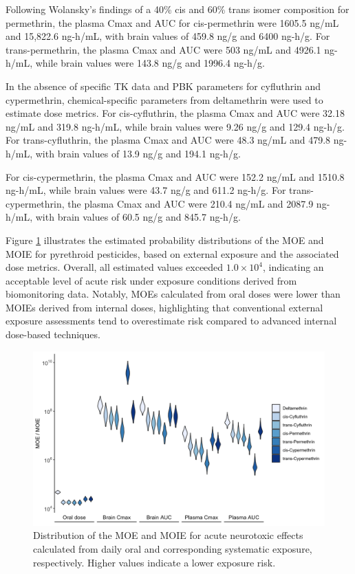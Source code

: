 \documentclass[toxics,article,submit,pdftex,moreauthors]{Definitions/mdpi}
\begin{document}
Following Wolansky's findings of a 40\% cis and 60\% trans isomer
composition for permethrin, the plasma Cmax and AUC for cis-permethrin
were 1605.5 ng/mL and 15,822.6 ng-h/mL, with brain values of 459.8 ng/g
and 6400 ng-h/g. For trans-permethrin, the plasma Cmax and AUC were 503
ng/mL and 4926.1 ng-h/mL, while brain values were 143.8 ng/g and 1996.4
ng-h/g.

In the absence of specific TK data and PBK parameters
for cyfluthrin and cypermethrin, chemical-specific parameters from
deltamethrin were used to estimate dose metrics. For cis-cyfluthrin, the
plasma Cmax and AUC were 32.18 ng/mL and 319.8 ng-h/mL, while brain
values were 9.26 ng/g and 129.4 ng-h/g. For trans-cyfluthrin, the plasma
Cmax and AUC were 48.3 ng/mL and 479.8 ng-h/mL, with brain values of
13.9 ng/g and 194.1 ng-h/g.

For cis-cypermethrin, the plasma Cmax and AUC were 152.2 ng/mL and
1510.8 ng-h/mL, while brain values were 43.7 ng/g and 611.2 ng-h/g. For
trans-cypermethrin, the plasma Cmax and AUC were 210.4 ng/mL and 2087.9
ng-h/mL, with brain values of 60.5 ng/g and 845.7 ng-h/g.

Figure \ref{fig:fig8} illustrates the estimated probability
distributions of the MOE and MOIE for pyrethroid pesticides, based on
external exposure and the associated dose metrics. Overall, all
estimated values exceeded \(1.0 \times 10^{4}\), indicating an
acceptable level of acute risk under exposure conditions derived from
biomonitoring data. Notably, MOEs calculated from oral doses were lower
than MOIEs derived from internal doses, highlighting that conventional
external exposure assessments tend to overestimate risk compared to
advanced internal dose-based techniques.

\begin{figure}[H]
\includegraphics[width=1\linewidth,]{figures/fig8} \caption{Distribution of the MOE and MOIE for acute neurotoxic effects calculated from daily oral and corresponding systematic exposure, respectively. Higher values indicate a lower exposure risk.}\label{fig:fig8}
\end{figure}
\end{document}
